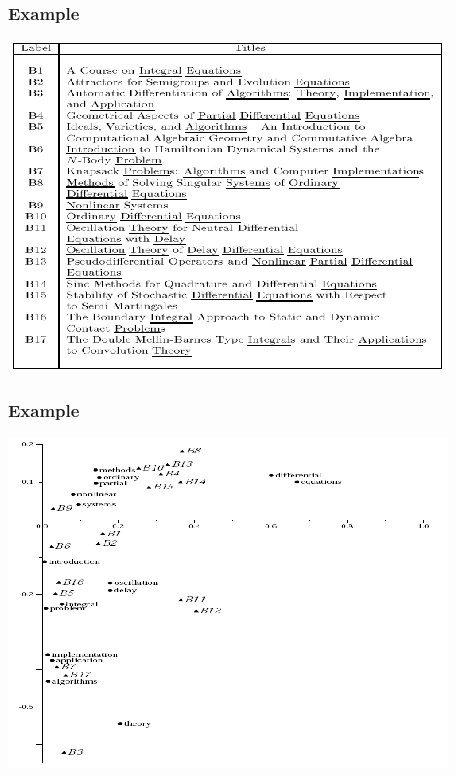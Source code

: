 \documentclass{beamer}
\begin{document}

\begin{frame}
  \frametitle{Example}

  \centering
  \includegraphics[width=\linewidth]{lsi1}

\end{frame}


\begin{frame}
  \frametitle{Example}

  \centering
  \includegraphics[width=\linewidth]{lsi2}

\end{frame}
\end{document}
